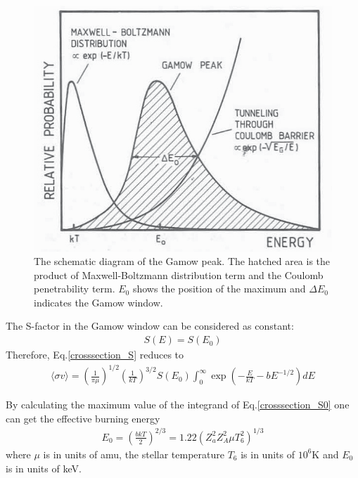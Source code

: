 \begin{figure}[tpb]
  \begin{center}
    \centerline{\includegraphics[scale=0.6]{graph/ch2/Gamow_window}}
    \caption{The schematic diagram of the Gamow peak. The hatched area is the product of Maxwell-Boltzmann distribution term and the  Coulomb penetrability term. $E_0$ shows the position of the maximum and $\Delta E_0$ indicates the Gamow window.}
    \label{fig:gamow_window}
  \end{center}
\end{figure}

The S-factor in the Gamow window can be considered as constant:
\begin{equation}
    \begin{aligned}
       S(E)=S(E_0)
    \end{aligned}
\end{equation}
Therefore, Eq.\ref{crosssection_S} reduces to
\begin{equation}
    \label{crosssection_S0}
    \begin{aligned}
     \langle\sigma v \rangle =(\frac{1}{\pi \mu})^{1/2} (\frac{1}{kT})^{3/2} S(E_0)\int_0^\infty  \exp(-\frac{E}{kT}-bE^{-1/2})dE
    \end{aligned}
\end{equation}

By calculating the maximum value of the integrand of Eq.\ref{crosssection_S0} one can get the effective burning energy
\begin{equation}
    \label{E_0}
    \begin{aligned}
       E_0=(\frac{bkT}{2})^{2/3}=1.22(Z_a^2 Z_A^2  \mu T_6^2)^{1/3}
    \end{aligned}
\end{equation}
where $\mu$ is in units of amu,  the stellar temperature $T_6$ is in units of $10^6$K and $E_0$  is in units of keV.

